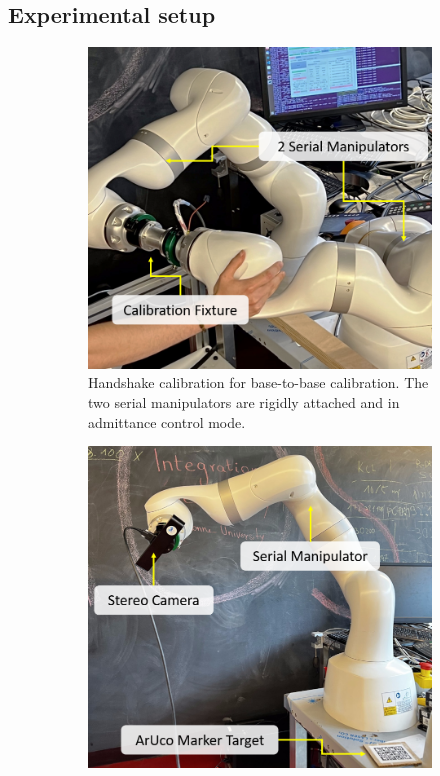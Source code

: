\subsection{Experimental setup}
\label{c4:sec:experimental_setup}
\begin{figure}
     \centering
     \begin{subfigure}[b]{0.3\textwidth}
         \centering
         \includegraphics[width=\textwidth]{fig/handshake.png}
         \caption{Handshake calibration for base-to-base calibration. The two serial manipulators are rigidly attached and in admittance control mode.}
         \label{c4:fig:handshake}
     \end{subfigure}
     \hfill
     \begin{subfigure}[b]{0.3\textwidth}
         \centering
         \includegraphics[width=\textwidth]{fig/eye_in_hand.png}

\end{subfigure}
\end{figure}
